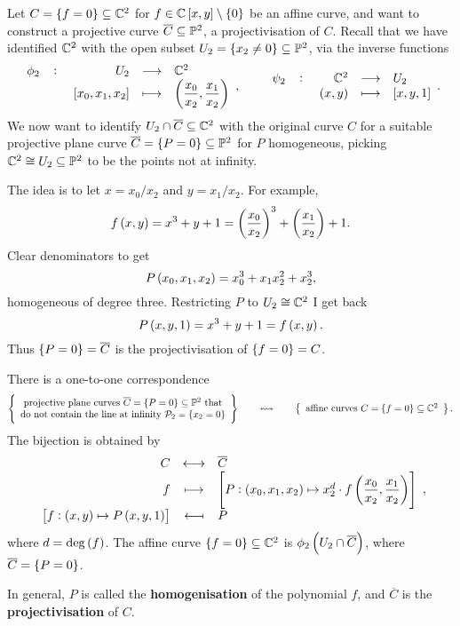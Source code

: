 Let $ C = \cbr{f = 0} \subseteq \C^2 $ for $ f \in \C\sbr{x, y} \setminus \cbr{0} $ be an affine curve, and want to construct a projective curve $ \overline{C} \subseteq \P^2 $, a projectivisation of $ C $. Recall that we have identified $ \C^2 $ with the open subset $ U_2 = \cbr{x_2 \ne 0} \subseteq \P^2 $, via the inverse functions
$$ \function[\phi_2]{U_2}{\C^2}{\sbr{x_0, x_1, x_2}}{\br{\dfrac{x_0}{x_2}, \dfrac{x_1}{x_2}}}, \qquad \function[\psi_2]{\C^2}{U_2}{\br{x, y}}{\sbr{x, y, 1}}. $$
We now want to identify $ U_2 \cap \overline{C} \subseteq \C^2 $ with the original curve $ C $ for a suitable projective plane curve $ \overline{C} = \cbr{P = 0} \subseteq \P^2 $ for $ P $ homogeneous, picking $ \C^2 \cong U_2 \subseteq \P^2 $ to be the points not at infinity.

\begin{example*}
The idea is to let $ x = x_0 / x_2 $ and $ y = x_1 / x_2 $. For example,
$$ f\br{x, y} = x^3 + y + 1 = \br{\dfrac{x_0}{x_2}}^3 + \br{\dfrac{x_1}{x_2}} + 1. $$
Clear denominators to get
$$ P\br{x_0, x_1, x_2} = x_0^3 + x_1x_2^2 + x_2^3, $$
homogeneous of degree three. Restricting $ P $ to $ U_2 \cong \C^2 $ I get back
$$ P\br{x, y, 1} = x^3 + y + 1 = f\br{x, y}. $$
Thus $ \cbr{P = 0} = \overline{C} $ is the projectivisation of $ \cbr{f = 0} = C $.
\end{example*}

\begin{theorem}
There is a one-to-one correspondence
$$ \correspondence{\text{projective plane curves} \ \overline{C} = \cbr{P = 0} \subseteq \P^2 \ \text{that} \\ \text{do not contain the line at infinity} \ \PP_2 = \cbr{x_2 = 0}}{\text{affine curves} \ C = \cbr{f = 0} \subseteq \C^2}. $$
The bijection is obtained by
$$
\begin{array}{rcl}
C & \longleftrightarrow & \overline{C} \\
f & \longmapsto & \sbr{P : \br{x_0, x_1, x_2} \mapsto x_2^d \cdot f\br{\dfrac{x_0}{x_2}, \dfrac{x_1}{x_2}}} \\
\sbr{f : \br{x, y} \mapsto P\br{x, y, 1}} & \longmapsfrom & P
\end{array},
$$
where $ d = \deg\br{f} $. The affine curve $ \cbr{f = 0} \subseteq \C^2 $ is $ \phi_2\br{U_2 \cap \overline{C}} $, where $ \overline{C} = \cbr{P = 0} $.
\end{theorem}

\begin{notation}
In general, $ P $ is called the \textbf{homogenisation} of the polynomial $ f $, and $ \overline{C} $ is the \textbf{projectivisation} of $ C $.
\end{notation}

